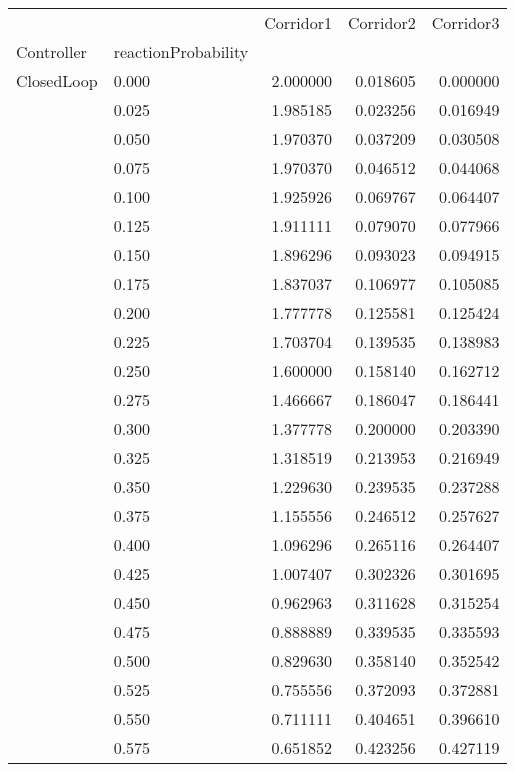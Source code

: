 \begin{tabular}{llrrr}
\toprule
         &       &  Corridor1 &  Corridor2 &  Corridor3 \\
Controller & reactionProbability &            &            &            \\
\midrule
ClosedLoop & 0.000 &   2.000000 &   0.018605 &   0.000000 \\
         & 0.025 &   1.985185 &   0.023256 &   0.016949 \\
         & 0.050 &   1.970370 &   0.037209 &   0.030508 \\
         & 0.075 &   1.970370 &   0.046512 &   0.044068 \\
         & 0.100 &   1.925926 &   0.069767 &   0.064407 \\
         & 0.125 &   1.911111 &   0.079070 &   0.077966 \\
         & 0.150 &   1.896296 &   0.093023 &   0.094915 \\
         & 0.175 &   1.837037 &   0.106977 &   0.105085 \\
         & 0.200 &   1.777778 &   0.125581 &   0.125424 \\
         & 0.225 &   1.703704 &   0.139535 &   0.138983 \\
         & 0.250 &   1.600000 &   0.158140 &   0.162712 \\
         & 0.275 &   1.466667 &   0.186047 &   0.186441 \\
         & 0.300 &   1.377778 &   0.200000 &   0.203390 \\
         & 0.325 &   1.318519 &   0.213953 &   0.216949 \\
         & 0.350 &   1.229630 &   0.239535 &   0.237288 \\
         & 0.375 &   1.155556 &   0.246512 &   0.257627 \\
         & 0.400 &   1.096296 &   0.265116 &   0.264407 \\
         & 0.425 &   1.007407 &   0.302326 &   0.301695 \\
         & 0.450 &   0.962963 &   0.311628 &   0.315254 \\
         & 0.475 &   0.888889 &   0.339535 &   0.335593 \\
         & 0.500 &   0.829630 &   0.358140 &   0.352542 \\
         & 0.525 &   0.755556 &   0.372093 &   0.372881 \\
         & 0.550 &   0.711111 &   0.404651 &   0.396610 \\
         & 0.575 &   0.651852 &   0.423256 &   0.427119 \\

\end{tabular}
